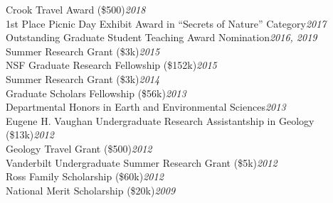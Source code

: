 \documentclass[11pt,margin,line]{resume}
\begin{document}
\begin{resume}
Crook Travel Award (\$500)\hfill \emph{2018}\\
1st Place Picnic Day Exhibit Award in “Secrets of Nature” Category\hfill \emph{2017}\\
Outstanding Graduate Student Teaching Award Nomination\hfill \emph{2016, 2019}\\
Summer Research Grant (\$3k)\hfill \emph{2015}\\
NSF Graduate Research Fellowship (\$152k)\hfill \emph{2015}\\
Summer Research Grant (\$3k)\hfill \emph{2014}\\
Graduate Scholars Fellowship (\$56k)\hfill \emph{2013}\\
Departmental Honors in Earth and Environmental Sciences\hfill \emph{2013}\\
Eugene H. Vaughan Undergraduate Research Assistantship in Geology (\$13k)\hfill \emph{2012}\\
Geology Travel Grant (\$500)\hfill \emph{2012}\\
Vanderbilt Undergraduate Summer Research Grant (\$5k)\hfill \emph{2012}\\
Ross Family Scholarship (\$60k)\hfill \emph{2012}\\
National Merit Scholarship (\$20k)\hfill \emph{2009}\\\\\\\\

\begin{comment}


\end{comment}
\end{resume}
\end{document}

